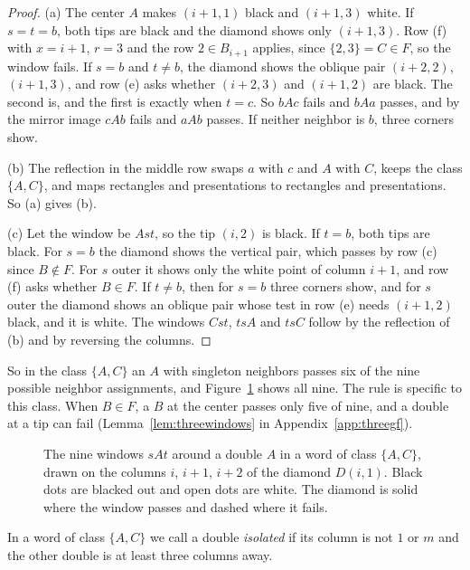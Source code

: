 \begin{proof}
(a) The center $A$ makes $(i+1,1)$ black and $(i+1,3)$ white. If $s=t=b$, both tips are black
and the diamond shows only $(i+1,3)$. Row (f) with $x=i+1$, $r=3$ and the row $2\in B_{i+1}$
applies, since $\{2,3\}=C\in F$, so the window fails. If $s=b$ and $t\ne b$, the diamond shows
the oblique pair $(i+2,2)$, $(i+1,3)$, and row (e) asks whether $(i+2,3)$ and $(i+1,2)$ are
black. The second is, and the first is exactly when $t=c$. So $bAc$ fails and $bAa$ passes,
and by the mirror image $cAb$ fails and $aAb$ passes. If neither neighbor is $b$, three
corners show.

(b) The reflection in the middle row swaps $a$ with $c$ and $A$ with $C$, keeps the class
$\{A,C\}$, and maps rectangles and presentations to rectangles and presentations. So (a)
gives (b).

(c) Let the window be $Ast$, so the tip $(i,2)$ is black. If $t=b$, both tips are black. For
$s=b$ the diamond shows the vertical pair, which passes by row (c) since $B\notin F$. For $s$
outer it shows only the white point of column $i+1$, and row (f) asks whether $B\in F$. If
$t\ne b$, then for $s=b$ three corners show, and for $s$ outer the diamond shows an oblique
pair whose test in row (e) needs $(i+1,2)$ black, and it is white. The windows $Cst$, $tsA$
and $tsC$ follow by the reflection of (b) and by reversing the columns.
\end{proof}

So in the class $\{A,C\}$ an $A$ with singleton neighbors passes six of the nine possible
neighbor assignments, and Figure~\ref{fig:sixofnine} shows all nine. The rule is specific to
this class. When $B\in F$, a $B$ at the center passes only five of nine, and a double at a tip
can fail (Lemma~\ref{lem:threewindows} in Appendix~\ref{app:threegf}).

\begin{figure}[t]
\centering
\resizebox{\textwidth}{!}{}
\caption{The nine windows $sAt$ around a double $A$ in a word of class $\{A,C\}$, drawn on the
columns $i$, $i+1$, $i+2$ of the diamond $D(i,1)$. Black dots are blacked out and open dots are
white. The diamond is solid where the window passes and dashed where it fails.}
\label{fig:sixofnine}
\end{figure}

In a word of class $\{A,C\}$ we call a double \emph{isolated} if its column is not $1$ or $m$
and the other double is at least three columns away.

